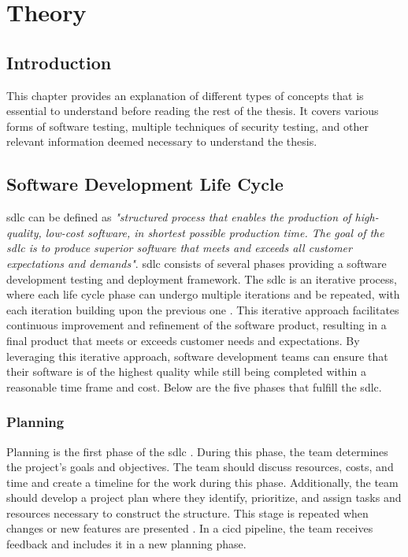 \newpage
\thispagestyle{empty}
\mbox{}
\chapter{Theory}
\label{chap:Theory}

\section{Introduction}
This chapter provides an explanation of different types of concepts that is essential to understand before reading the rest of the thesis. It covers various forms of software testing, multiple techniques of security testing, and other relevant information deemed necessary to understand the thesis.

\section{Software Development Life Cycle}
\acrlong{sdlc} can be defined as \textit{"structured process that enables the production of high-quality, low-cost software, in shortest possible production time. The goal of the \acrshort{sdlc} is to produce superior software that meets and exceeds all customer expectations and demands"}\cite{sdlc1}. \acrshort{sdlc} consists of several phases providing a software development testing and deployment framework. The \acrlong{sdlc} is an iterative process, where each life cycle phase can undergo multiple iterations and be repeated, with each iteration building upon the previous one \cite{sdlcinterative}. This iterative approach facilitates continuous improvement and refinement of the software product, resulting in a final product that meets or exceeds customer needs and expectations. By leveraging this iterative approach, software development teams can ensure that their software is of the highest quality while still being completed within a reasonable time frame and cost. Below are the five phases that fulfill the \acrshort{sdlc}. 

\subsection{Planning} 
Planning is the first phase of the \acrshort{sdlc} \cite{planningphase}. During this phase, the team determines the project's goals and objectives. The team should discuss resources, costs, and time and create a timeline for the work during this phase. Additionally, the team should develop a project plan where they identify, prioritize, and assign tasks and resources necessary to construct the structure. This stage is repeated when changes or new features are presented \cite{PlanningPhaseRepeat}. In a \acrshort{cicd} \gls{pipeline}, the team receives feedback and includes it in a new planning phase.

